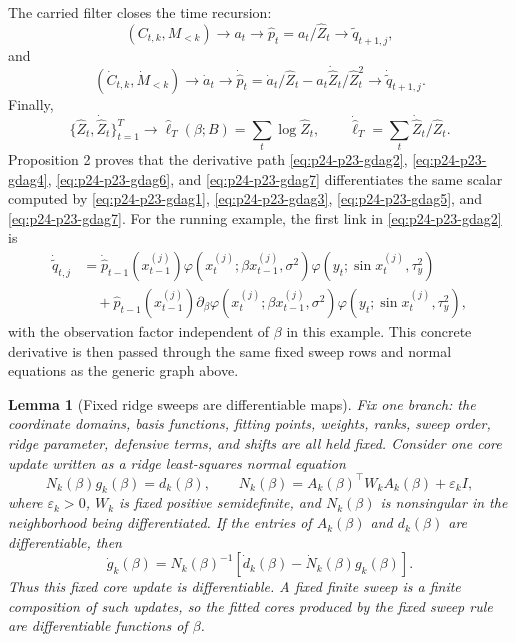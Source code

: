 \documentclass[11pt]{article}
\newtheorem{lemma}{Lemma}
\begin{document}
The carried filter closes the time recursion:
\[
    (C_{t,k},M_{<k})
    \to
    a_t
    \to
    \widehat p_t=a_t/\widehat Z_t
    \to
    \widetilde q_{t+1,j},
    \label{eq:p24-p23-gdag5}
\]
and
\[
    (\dot C_{t,k},\dot M_{<k})
    \to
    \dot a_t
    \to
    \dot{\widehat p}_t
    =
    \dot a_t/\widehat Z_t-a_t\dot{\widehat Z}_t/\widehat Z_t^2
    \to
    \dot{\widetilde q}_{t+1,j}.
    \label{eq:p24-p23-gdag6}
\]
Finally,
\[
    \{\widehat Z_t,\dot{\widehat Z}_t\}_{t=1}^T
    \to
    \widehat\ell_T(\beta;B)
    =
    \sum_t\log\widehat Z_t,
    \qquad
    \dot{\widehat\ell}_T
    =
    \sum_t\dot{\widehat Z}_t/\widehat Z_t.
    \label{eq:p24-p23-gdag7}
\]
Proposition 2 proves that the derivative path \eqref{eq:p24-p23-gdag2},
\eqref{eq:p24-p23-gdag4}, \eqref{eq:p24-p23-gdag6}, and \eqref{eq:p24-p23-gdag7} differentiates the same scalar
computed by \eqref{eq:p24-p23-gdag1}, \eqref{eq:p24-p23-gdag3}, \eqref{eq:p24-p23-gdag5}, and \eqref{eq:p24-p23-gdag7}.
For the running example, the first link in \eqref{eq:p24-p23-gdag2} is
\[
\begin{aligned}
    \dot{\widetilde q}_{t,j}
    &=
    \dot{\widehat p}_{t-1}(x_{t-1}^{(j)})
    \varphi(x_t^{(j)};\beta x_{t-1}^{(j)},\sigma^2)
    \varphi(y_t;\sin x_t^{(j)},\tau_y^2)\\
    &\quad+
    \widehat p_{t-1}(x_{t-1}^{(j)})
    \partial_\beta
    \varphi(x_t^{(j)};\beta x_{t-1}^{(j)},\sigma^2)
    \varphi(y_t;\sin x_t^{(j)},\tau_y^2),
\end{aligned}
    \label{eq:p24-p23-gdag8}
\]
with the observation factor independent of \(\beta\) in this example.  This
concrete derivative is then passed through the same fixed sweep rows and
normal equations as the generic graph above.

\begin{lemma}[Fixed ridge sweeps are differentiable maps]
Fix one branch: the coordinate domains, basis functions, fitting points,
weights, ranks, sweep order, ridge parameter, defensive terms, and shifts are
all held fixed.  Consider one core update written as a ridge least-squares
normal equation
\[
    N_k(\beta)g_k(\beta)=d_k(\beta),
    \qquad
    N_k(\beta)=A_k(\beta)^\top W_k A_k(\beta)+\varepsilon_k I,
\]
where \(\varepsilon_k>0\), \(W_k\) is fixed positive semidefinite, and
\(N_k(\beta)\) is nonsingular in the neighborhood being differentiated.  If the
entries of \(A_k(\beta)\) and \(d_k(\beta)\) are differentiable, then
\[
    \dot g_k(\beta)
    =
    N_k(\beta)^{-1}
    \left[
    \dot d_k(\beta)-\dot N_k(\beta)g_k(\beta)
    \right].
\]
Thus this fixed core update is differentiable.  A fixed finite sweep is a
finite composition of such updates, so the fitted cores produced by the fixed
sweep rule are differentiable functions of \(\beta\).
\end{lemma}
\end{document}
